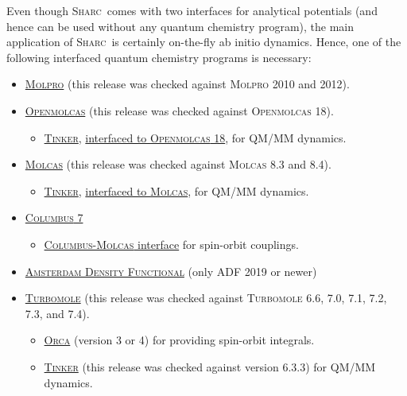 \documentclass[a4paper,10pt,DIV=15,openany]{scrbook}
\newcommand{\link}[2]{\href{#1}{#2}}
\newcommand{\sharc}{\textsc{Sharc}}
\begin{document}
Even though \sharc\ comes with two interfaces for analytical potentials (and hence can be used without any quantum chemistry program), the main application of \sharc\ is certainly on-the-fly ab initio dynamics. Hence, one of the following interfaced quantum chemistry programs is necessary:
\begin{itemize}
  \item \link{http://www.molpro.net/}{\textsc{Molpro}} (this release was checked against \textsc{Molpro} 2010 and 2012).
  \item \link{https://gitlab.com/Molcas/OpenMolcas/}{\textsc{Openmolcas}} (this release was checked against \textsc{Openmolcas} 18).
  \begin{itemize}
    \item \link{http://dasher.wustl.edu/tinker/}{\textsc{Tinker}}, \link{http://www.molcas.org/documentation/manual/node79.html\#SECTION052122010000000000000}{interfaced to \textsc{Openmolcas} 18}, for QM/MM dynamics.
  \end{itemize}
  \item \link{http://www.molcas.org/}{\textsc{Molcas}} (this release was checked against \textsc{Molcas} 8.3 and 8.4).
  \begin{itemize}
    \item \link{http://dasher.wustl.edu/tinker/}{\textsc{Tinker}}, \link{http://www.molcas.org/documentation/manual/node79.html\#SECTION052122010000000000000}{interfaced to \textsc{Molcas}}, for QM/MM dynamics.
  \end{itemize}
  \item \link{http://www.univie.ac.at/columbus/docs_COL70/documentation_main.html}{\textsc{Columbus} 7}
  \begin{itemize}
    \item \link{http://www.univie.ac.at/columbus/docs_COL70/columbus_molcas_link.html}{\textsc{Columbus-Molcas} interface} for spin-orbit couplings.
  \end{itemize}
  \item \link{http://www.scm.com/ADF}{\textsc{Amsterdam Density Functional}} (only ADF 2019 or newer)
  \item \link{http://www.turbomole.com}{\textsc{Turbomole}} (this release was checked against \textsc{Turbomole} 6.6, 7.0, 7.1, 7.2, 7.3, and 7.4).
  \begin{itemize}
    \item \link{https://orcaforum.kofo.mpg.de}{\textsc{Orca}} (version 3 or 4) for providing spin-orbit integrals.
    \item \link{http://dasher.wustl.edu/tinker/}{\textsc{Tinker}} (this release was checked against version 6.3.3) for QM/MM dynamics.

\end{itemize}
\end{itemize}
\end{document}
